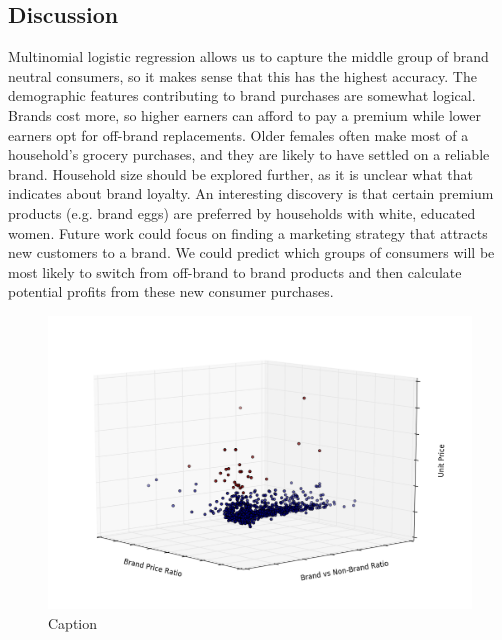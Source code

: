 \documentclass[conference]{IEEEtran}
\begin{document}
\subsection{Discussion}
Multinomial logistic regression allows us to capture the middle group of brand neutral consumers, so it makes sense that this has the highest accuracy.
The demographic features contributing to brand purchases are somewhat logical. Brands cost more, so higher earners can afford to pay a premium while lower earners opt for off-brand replacements. Older females often make most of a household’s grocery purchases, and they are likely to have settled on a reliable brand. Household size should be explored further, as it is unclear what that indicates about brand loyalty. An interesting discovery is that certain premium products (e.g. brand eggs) are preferred by households with white, educated women. 
Future work could focus on finding a marketing strategy that attracts new customers to a brand. We could predict which groups of consumers will be most likely to switch from off-brand to brand products and then calculate potential profits from these new consumer purchases.

\begin{figure}
\centering
        \includegraphics[totalheight=6cm]{clusters}
    \caption{Caption}
    \label{fig:verticalcell}
\end{figure}
\end{document}
